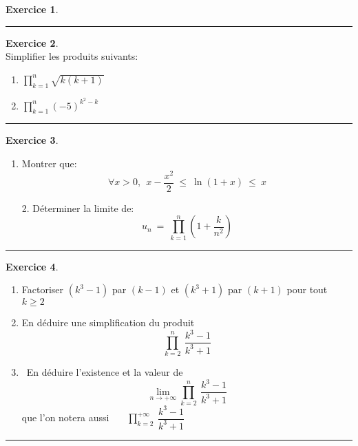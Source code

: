 \documentclass[10pt,a4paper]{article}
\theoremstyle{definition}
\theoremstyle{definition}
\newtheorem{exo}{Exercice}
\begin{document}
\begin{center}
\begin{minipage}[t]{0.45\linewidth}
\begin{exo}
\end{exo}
\begin{center}
\rule{1\linewidth}{0.6pt}
\end{center}
\begin{exo}\quad\\ 
Simplifier les produits suivants:
\begin{multicols}{2}
\begin{enumerate}
\item $\prod\limits_{k=1}^{n}\sqrt{k(k+1)}$
\item$\prod\limits_{k=1}^{n}(-5)^{k^2-k}$
\end{enumerate}
\end{multicols}
\end{exo}
\begin{center}
\rule{1\linewidth}{0.6pt}
\end{center}
\begin{exo}\quad\\ 
\begin{enumerate}
\item Montrer que:
$$\forall x > 0 , ~~ x-\dfrac{x^2}{2} \ \leq \ \ln(1+x)  \ \leq \ x$$
\end{enumerate}
\end{exo}
\end{minipage}	
\hfill\vrule\hfill
\begin{minipage}[t]{0.45\linewidth}
\raggedright
\begin{enumerate}
\item[2.] Déterminer la limite de:
$$u_n \ = \ \prod\limits_{k=1}^{n}\left(1 + \dfrac{k}{n^2}\right)$$
\end{enumerate}
\begin{center}
\rule{1\linewidth}{0.6pt}
\end{center}
\begin{exo}\quad\\
\begin{enumerate}
\item Factoriser $(k^3-1)$ par $(k-1)$ et $(k^3+1)$ par $(k+1)$ pour tout $k\geq 2$
\item En déduire une simplification du produit 
$$\prod\limits_{k=2}^{n}~\dfrac{k^3-1}{k^3+1}$$
\item~En déduire l'existence et la valeur de $$\lim\limits_{n \rightarrow +\infty} \prod\limits_{k=2}^{n}~\dfrac{k^3-1}{k^3+1} $$ que l'on notera aussi~~~ $\prod\limits_{k=2}^{+\infty}~\dfrac{k^3-1}{k^3+1}$
\end{enumerate}
\end{exo}
\begin{center}
\rule{1\linewidth}{0.6pt}
\end{center}




	\end{minipage}
\end{center}
\end{document}
